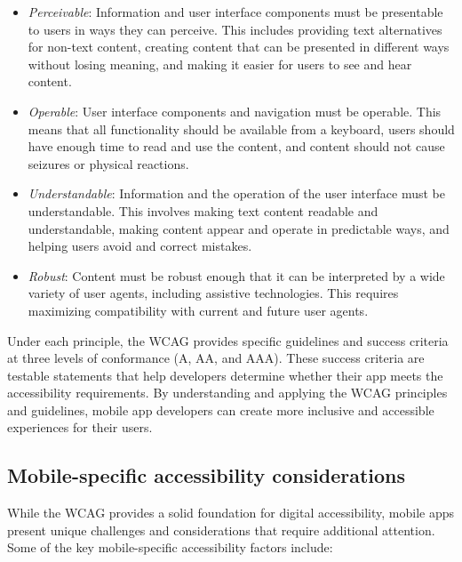 \begin{itemize}
    \item \textit{Perceivable}: Information and user interface components must be presentable to users in ways they can perceive. This includes providing text alternatives for non-text content, creating content that can be presented in different ways without losing meaning, and making it easier for users to see and hear content.
    \item \textit{Operable}: User interface components and navigation must be operable. This means that all functionality should be available from a keyboard, users should have enough time to read and use the content, and content should not cause seizures or physical reactions.
    \item \textit{Understandable}: Information and the operation of the user interface must be understandable. This involves making text content readable and understandable, making content appear and operate in predictable ways, and helping users avoid and correct mistakes.
    \item \textit{Robust}: Content must be robust enough that it can be interpreted by a wide variety of user agents, including assistive technologies. This requires maximizing compatibility with current and future user agents.
\end{itemize}

Under each principle, the WCAG provides specific guidelines and success criteria at three levels of conformance (A, AA, and AAA). These success criteria are testable statements that help developers determine whether their app meets the accessibility requirements. By understanding and applying the WCAG principles and guidelines, mobile app developers can create more inclusive and accessible experiences for their users.

\subsection{Mobile-specific accessibility considerations}

While the WCAG provides a solid foundation for digital accessibility, mobile apps present unique challenges and considerations that require additional attention. Some of the key mobile-specific accessibility factors include:

